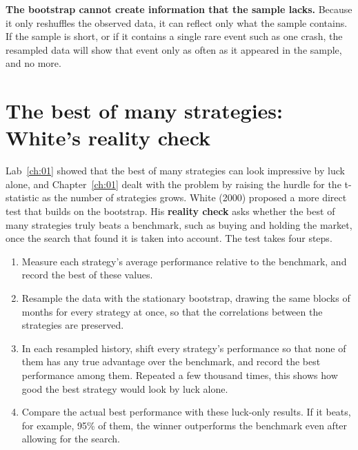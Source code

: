 \textbf{The bootstrap cannot create information that the sample lacks.} Because it only reshuffles the observed data, it can reflect only what the sample contains. If the sample is short, or if it contains a single rare event such as one crash, the resampled data will show that event only as often as it appeared in the sample, and no more.

\section{The best of many strategies: White's reality check}
\label{sec:03-reality}

Lab~\ref{ch:01} showed that the best of many strategies can look impressive by luck alone, and Chapter~\ref{ch:01} dealt with the problem by raising the hurdle for the t-statistic as the number of strategies grows. White (2000) proposed a more direct test that builds on the bootstrap. His \textbf{reality check} asks whether the best of many strategies truly beats a benchmark, such as buying and holding the market, once the search that found it is taken into account. The test takes four steps.

\begin{enumerate}
  \item Measure each strategy's average performance relative to the benchmark, and record the best of these values.
  \item Resample the data with the stationary bootstrap, drawing the same blocks of months for every strategy at once, so that the correlations between the strategies are preserved.
  \item In each resampled history, shift every strategy's performance so that none of them has any true advantage over the benchmark, and record the best performance among them. Repeated a few thousand times, this shows how good the best strategy would look by luck alone.
  \item Compare the actual best performance with these luck-only results. If it beats, for example, 95\% of them, the winner outperforms the benchmark even after allowing for the search.
\end{enumerate}

